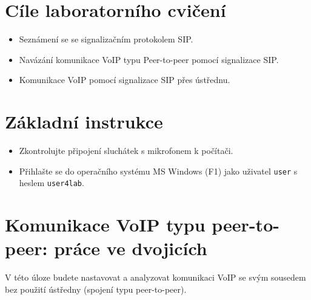 \section*{Cíle laboratorního cvičení}
\begin{itemize}
  \item Seznámení se se signalizačním protokolem SIP.
  \item Navázání komunikace VoIP typu Peer-to-peer pomocí signalizace SIP.
  \item Komunikace VoIP pomocí signalizace SIP přes ústřednu.
\end{itemize}

\section*{Základní instrukce}
\begin{itemize}
  \item Zkontrolujte připojení sluchátek s mikrofonem k počítači. 
  \item Přihlašte se do operačního systému MS Windows (F1) jako uživatel {\tt user} s heslem {\tt user4lab}.
\end{itemize}

\section{Komunikace VoIP typu peer-to-peer: práce ve dvojicích}
V této úloze budete nastavovat a analyzovat komunikaci VoIP se svým sousedem bez použití ústředny (spojení typu peer-to-peer).

